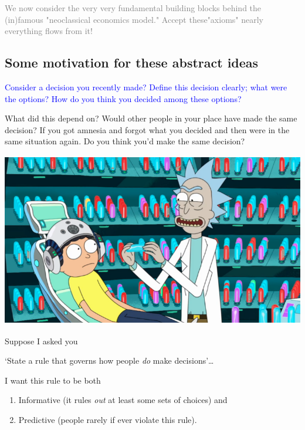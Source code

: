 \documentclass[]{article}
\begin{document}
\textcolor{gray}{We now consider the very very fundamental building blocks behind the (in)famous "neoclassical economics model." Accept these"axioms" nearly everything flows from it!}

\hypertarget{some-motivation-for-these-abstract-ideas}{%
\subsection{Some motivation for these abstract
ideas}\label{some-motivation-for-these-abstract-ideas}}

\textcolor{blue}{Consider a decision you recently made?  Define this decision clearly; what were the options?  How do you think you decided among these options?}

What did this depend on? Would other people in your place have made the
same decision? If you got amnesia and forgot what you decided and then
were in the same situation again. Do you think you'd make the same
decision?

\includegraphics[height=3in]{picsfigs/mortys-mind-blower.png}

\bigskip

Suppose I asked you

`State a rule that governs how people \emph{do} make decisions'\ldots{}

I want this rule to be both

\begin{enumerate}
\def\labelenumi{\arabic{enumi}.}
\item
  Informative (it rules \emph{out} at least some sets of choices) and
\item
  Predictive (people rarely if ever violate this rule).
\end{enumerate}

\bigskip
\end{document}
